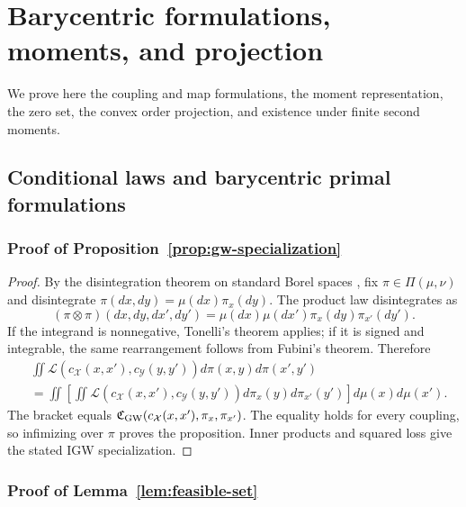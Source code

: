 \documentclass[11pt]{article}
\theoremstyle{plain}
\theoremstyle{definition}
\theoremstyle{remark}
\begin{document}
\section{Barycentric formulations, moments, and projection}
\label{app:barycentric-proofs}

We prove here the coupling and map formulations, the moment representation, the zero
set, the convex order projection, and existence under finite second moments.

\subsection{Conditional laws and barycentric primal formulations}

\subsubsection{Proof of Proposition~\ref{prop:gw-specialization}}\label{proof:3.2}

\begin{proof}
By the disintegration theorem on standard Borel spaces
\cite[Theorem~3.4]{Kallenberg}, fix $\pi\in\Pi(\mu,\nu)$ and disintegrate
$\pi(dx,dy)=\mu(dx)\pi_x(dy)$.  The product law disintegrates as
\[
 (\pi\otimes\pi)(dx,dy,dx',dy')
 =\mu(dx)\mu(dx')\pi_x(dy)\pi_{x'}(dy').
\]
If the integrand is nonnegative, Tonelli's theorem applies; if it is signed and
integrable, the same rearrangement follows from Fubini's theorem.  Therefore
\begin{align*}
 &\iint\mathcal L(c_{\mathcal X}(x,x'),c_{\mathcal Y}(y,y'))
 d\pi(x,y)d\pi(x',y')\\
 &=\iint\left[\iint
 \mathcal L(c_{\mathcal X}(x,x'),c_{\mathcal Y}(y,y'))
 d\pi_x(y)d\pi_{x'}(y')\right]d\mu(x)d\mu(x').
\end{align*}
The bracket equals
$\mathfrak C_{\rm GW}(c_{\mathcal X}(x,x'),\pi_x,\pi_{x'})$.  The equality
holds for every coupling, so infimizing over $\pi$ proves the proposition.  Inner
products and squared loss give the stated IGW specialization.
\end{proof}

\subsubsection{Proof of Lemma~\ref{lem:feasible-set}}\label{proof:4.1}
\end{document}
